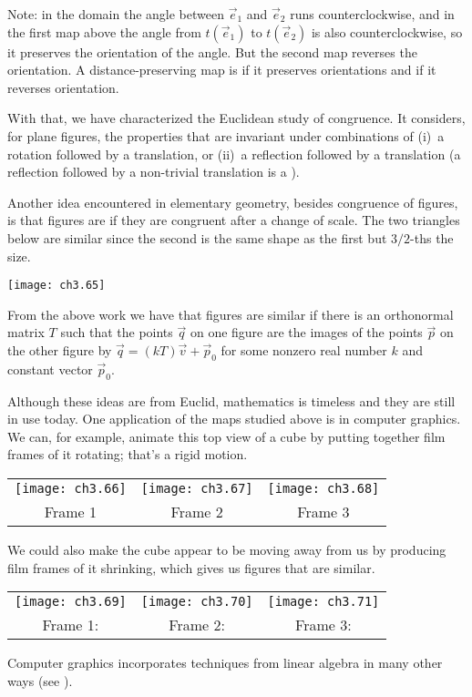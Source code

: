 Note: in the domain  
the angle between $\vec{e}_1$ and $\vec{e}_2$ runs counterclockwise,
and in the first map above the angle from 
$t(\vec{e}_1)$ to $t(\vec{e}_2)$ is also counterclockwise,
so it preserves the orientation of the angle.
But the second map reverses the orientation.
A distance-preserving map is 
 if it 
preserves orientations
and  
if it reverses orientation.

With that, we have characterized the Euclidean study of congruence.
It considers, for plane figures, the properties that are invariant 
under combinations of (i)~a rotation followed by a translation,
or (ii)~a reflection followed by a translation
(a reflection followed by a non-trivial 
translation is a ).

Another idea encountered in 
elementary geometry, besides congruence of figures, is
that figures are 
if they are congruent after a change of scale. 
The two triangles below are similar since the second is 
the same shape as the first but $3/2$-ths the size.
\begin{center}
  \texttt{[image: ch3.65]}
\end{center}
From the above work we have that figures are similar if there
is an orthonormal matrix $T$ such that the points $\vec{q}$ 
on one figure are the images of 
the points $\vec{p}$ on the other figure by 
$\vec{q}=(kT)\vec{v}+\vec{p}_0$
for some nonzero real number $k$ and constant vector $\vec{p}_0$.

Although these ideas are from Euclid, mathematics is timeless and
they are still in use today. 
One application of the maps studied above is in computer graphics.
We can, for example, animate this top view of a cube 
by putting together film frames of it rotating; that's a rigid motion. 
\begin{center}
  \begin{tabular}{ccc}
    \texttt{[image: ch3.66]}
    &\texttt{[image: ch3.67]}
    &\texttt{[image: ch3.68]}                       \\
    Frame 1      &Frame 2       &Frame 3       
  \end{tabular}
\end{center}
We could also make the cube appear to be moving away from us by producing film
frames of it shrinking, which gives us figures that are similar.
\begin{center}
  \begin{tabular}{ccc}
    \texttt{[image: ch3.69]}
    &\texttt{[image: ch3.70]}
    &\texttt{[image: ch3.71]}                       \\
    Frame 1:        &Frame 2:       &Frame 3:        
  \end{tabular}
\end{center}
Computer graphics incorporates techniques
from linear algebra in many other ways (see ).


